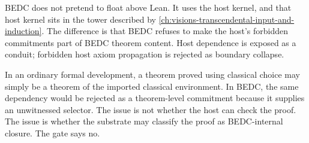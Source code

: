 \begin{remark}
\label{rem:audit-gates-host-dependence-exposed}
BEDC does not pretend to float above Lean. It uses the host kernel, and that host kernel sits in the tower described by \autoref{ch:visions-transcendental-input-and-induction}. The difference is that BEDC refuses to make the host's forbidden commitments part of BEDC theorem content. Host dependence is exposed as a conduit; forbidden host axiom propagation is rejected as boundary collapse.
\end{remark}

\begin{example}
\label{ex:audit-gates-hidden-cic-commitment}
In an ordinary formal development, a theorem proved using classical choice may simply be a theorem of the imported classical environment. In BEDC, the same dependency would be rejected as a theorem-level commitment because it supplies an unwitnessed selector. The issue is not whether the host can check the proof. The issue is whether the substrate may classify the proof as BEDC-internal closure. The gate says no.
\end{example}

